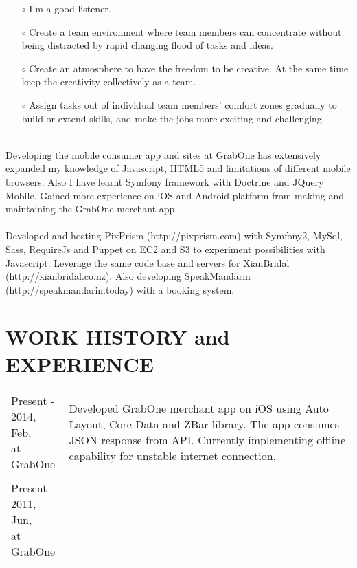 \begin{resume}
\begin{itemize}
\item[$\circ$] I'm a good listener.
\item[$\circ$] Create a team environment where team members can concentrate without being distracted by rapid changing flood of tasks and ideas.
\item[$\circ$] Create an atmosphere to have the freedom to be creative. At the same time keep the creativity collectively as a team.
\item[$\circ$] Assign tasks out of individual team members' comfort zones gradually to build or extend skills, and make the jobs more exciting and challenging.\\\\
\end{itemize} 
Developing the mobile consumer app and sites at GrabOne has extensively expanded my knowledge of Javascript, HTML5 and limitations of different mobile browsers. Also I have learnt Symfony framework with Doctrine and JQuery Mobile. Gained more experience on iOS and Android platform from making and maintaining the GrabOne merchant app.\\\\
Developed and hosting PixPrism (http://pixprism.com) with Symfony2, MySql, Sass, RequireJs and Puppet on EC2 and S3 to experiment possibilities with Javascript. Leverage the same code base and servers for XianBridal (http://xianbridal.co.nz). Also developing SpeakMandarin\\(http://speakmandarin.today) with a booking system.

\section{WORK HISTORY and EXPERIENCE} 
\vspace{0.15in} 

\begin{tabular}{ll}
\parbox[t]{35mm}{Present - \\ 2014, Feb,\\at GrabOne} & \parbox[t]{111mm}{

Developed GrabOne merchant app on iOS using Auto Layout, Core Data and ZBar library. The app consumes JSON response from API. Currently implementing offline capability for unstable internet connection.

}\\\\
\parbox[t]{35mm}{Present - \\ 2011, Jun,\\at GrabOne} & \parbox[t]{111mm}{

}
\end{tabular}
\end{resume}
